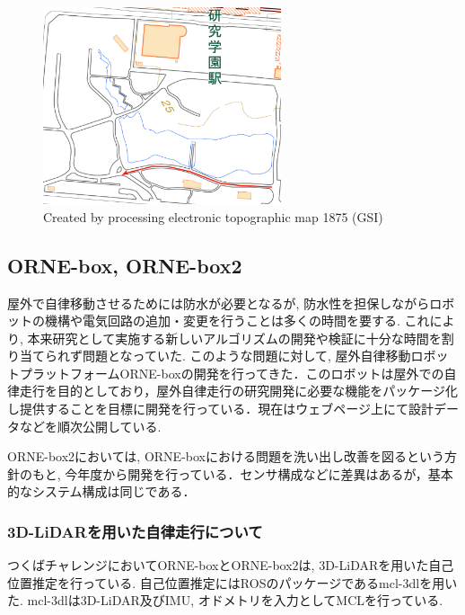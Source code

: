 \documentclass[uplatex, twocolumn, 9pt]{jsproceedings}
\begin{document}
\begin{figure}[h]
  \centering
  \includegraphics[width=70mm]{fig/dist220.pdf}
  \caption{Created by processing electronic topographic map 1875 (GSI)}
  \label{fig:dist220}%
\end{figure}

\newpage
\subsection{ORNE-box, ORNE-box2}
屋外で自律移動させるためには防水が必要となるが, 防水性を担保しながらロボットの機構や電気回路の追加・変更を行うことは多くの時間を要する. これにより, 本来研究として実施する新しいアルゴリズムの開発や検証に十分な時間を割り当てられず問題となっていた. このような問題に対して, 屋外自律移動ロボットプラットフォームORNE-boxの開発\cite{si-box}を行ってきた．このロボットは屋外での自律走行を目的としており，屋外自律走行の研究開発に必要な機能をパッケージ化し提供することを目標に開発を行っている．現在はウェブページ上\cite{box}にて設計データなどを順次公開している. \par 
ORNE-box2においては, ORNE-boxにおける問題を洗い出し改善を図るという方針のもと, 今年度から開発を行っている．センサ構成などに差異はあるが，基本的なシステム構成は同じである．

\subsubsection{3D-LiDARを用いた自律走行について}
つくばチャレンジにおいてORNE-boxとORNE-box2は, 3D-LiDARを用いた自己位置推定を行っている. 自己位置推定にはROSのパッケージであるmcl-3dl\cite{mcl-3dl}を用いた. mcl-3dlは3D-LiDAR及びIMU, オドメトリを入力としてMCLを行っている.
\end{document}
